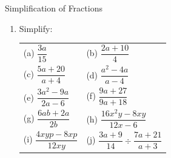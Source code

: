     
\begin{exercises}{ Simplification of Fractions }
 {           \nopagebreak
      \label{m39392*id280133}\begin{enumerate}[itemsep=5pt, label=\textbf{\arabic*}. ] 
            \label{m39392*uid53}\item Simplify:
          \begin{table}[H]
        \begin{center}
      \label{m39392*id280148}
    \noindent
    \tabletail{%
        \hline
        \hline
      }
      \tablelasttail{}
      \begin{xtabular}[t]{|l|l|}\hline
        (a) $\dfrac{3a}{15}$\hspace{1ex} &
        (b) $\dfrac{2a+10}{4}$\hspace{1ex}%
     \tabularnewline{}
        (c) $\dfrac{5a+20}{a+4}$\hspace{1ex} &
        (d) $\dfrac{{a}^{2}-4a}{a-4}$\hspace{1ex}%
     \tabularnewline{}
        (e) $\dfrac{3{a}^{2}-9a}{2a-6}$\hspace{1ex} &
        (f) $\dfrac{9a+27}{9a+18}$\hspace{1ex}%
     \tabularnewline{}
        (g) $\dfrac{6ab+2a}{2b}$\hspace{1ex} &
        (h) $\dfrac{16{x}^{2}y-8xy}{12x-6}$\hspace{1ex}%
     \tabularnewline{}
        (i) $\dfrac{4xyp-8xp}{12xy}$\hspace{1ex} &
        (j) $\dfrac{3a+9}{14}÷\dfrac{7a+21}{a+3}$\hspace{1ex}%
     \tabularnewline{}

\end{xtabular}
\end{center}
\end{table}
\end{enumerate}}
\end{exercises}
